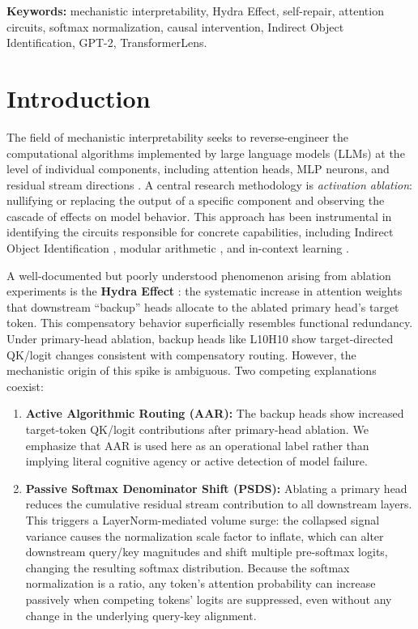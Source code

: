 \documentclass[12pt,a4paper]{article}
\begin{document}
\textbf{Keywords:} mechanistic interpretability, Hydra Effect, self-repair,
attention circuits, softmax normalization, causal intervention, Indirect Object
Identification, GPT-2, TransformerLens.

\vspace{1.5em}

\section{Introduction}
\label{sec:intro}

The field of mechanistic interpretability seeks to reverse-engineer the
computational algorithms implemented by large language models (LLMs) at the
level of individual components, including attention heads, MLP neurons, and residual
stream directions \citep{elhage2021mathematical, olah2020zoom}. A central
research methodology is \emph{activation ablation}: nullifying or replacing the
output of a specific component and observing the cascade of effects on model
behavior. This approach has been instrumental in identifying the circuits
responsible for concrete capabilities, including Indirect Object Identification
\citep{wang2022interpretability}, modular arithmetic \citep{nanda2023progress},
and in-context learning \citep{olsson2022context}.

A well-documented but poorly understood phenomenon arising from ablation
experiments is the \textbf{Hydra Effect} \citep{mcgrath2023hydra}: the
systematic increase in attention weights that downstream ``backup'' heads
allocate to the ablated primary head's target token. This compensatory behavior
superficially resembles functional redundancy. Under primary-head ablation, backup heads
like L10H10 show target-directed QK/logit changes consistent with compensatory routing.
However, the mechanistic origin of this spike is ambiguous.
Two competing explanations coexist:

\begin{enumerate}
  \item \textbf{Active Algorithmic Routing (AAR):} The backup heads show increased target-token QK/logit contributions after primary-head ablation. We emphasize that AAR is used here as an operational label rather than implying literal cognitive agency or active detection of model failure.
  \item \textbf{Passive Softmax Denominator Shift (PSDS):} Ablating a primary
    head reduces the cumulative residual stream contribution to all downstream
    layers. This triggers a LayerNorm-mediated volume surge: the collapsed signal
    variance causes the normalization scale factor to inflate, which can alter downstream query/key magnitudes and shift multiple pre-softmax logits, changing the resulting softmax distribution. Because the
    softmax normalization is a ratio, any token's attention probability can
    increase passively when competing tokens' logits are suppressed, even without
    any change in the underlying query-key alignment.
\end{enumerate}
\end{document}
